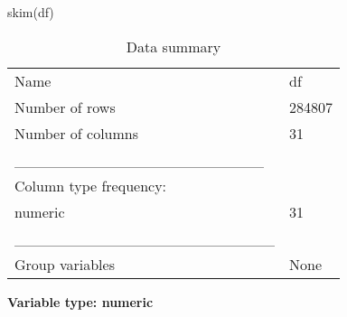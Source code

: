 \documentclass[
  11pt,
  letterpaper,
  DIV=11,
  numbers=noendperiod]{scrartcl}
\newenvironment{Shaded}{}{}
\newcommand{\FunctionTok}[1]{\textcolor[rgb]{0.44,0.26,0.76}{#1}}
\newcommand{\NormalTok}[1]{\textcolor[rgb]{0.14,0.16,0.18}{#1}}
\begin{document}
\begin{Shaded}
\begin{Highlighting}[]
\FunctionTok{skim}\NormalTok{(df)}
\end{Highlighting}
\end{Shaded}

\begin{longtable}[]{@{}ll@{}}
\caption{Data summary}\tabularnewline
\toprule\noalign{}
\endfirsthead
\endhead
\bottomrule\noalign{}
\endlastfoot
Name & df \\
Number of rows & 284807 \\
Number of columns & 31 \\
\_\_\_\_\_\_\_\_\_\_\_\_\_\_\_\_\_\_\_\_\_\_\_ & \\
Column type frequency: & \\
numeric & 31 \\
\_\_\_\_\_\_\_\_\_\_\_\_\_\_\_\_\_\_\_\_\_\_\_\_ & \\
Group variables & None \\
\end{longtable}

\textbf{Variable type: numeric}
\end{document}
